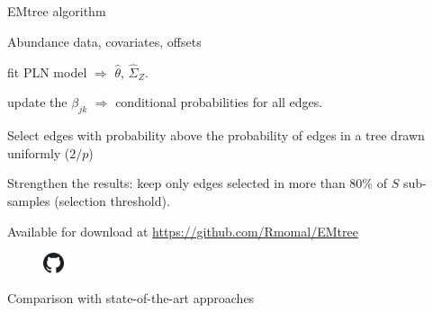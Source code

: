 \documentclass[11pt]{beamer}
\newcommand{\emphase}[1]{\textcolor{Complement}{#1}}
\newcommand{\bleu}[1]{\textcolor{Framableulight}{#1}}
\begin{document}
\subsection{}
\begin{frame}{EMtree algorithm}
\begin{description}
\normalsize
\item [Input: ] \hspace{0.35cm}Abundance data, covariates, offsets\vspace{0.2cm}

\item [1rst step: ] \hspace{0.3cm} \emphase{fit PLN model} $\Rightarrow$  $\hat{\theta}$, $\hat{\Sigma}_Z$. \vspace{0.2cm}
\item [2nd step: ] \hspace{0.3cm} \emphase{update the $\beta_{jk}$} $\Rightarrow$ conditional probabilities for all edges.\\ \hspace{0.3cm} 
\bigskip
\item [Thresholding: ] Select edges with probability above the probability of edges in a tree drawn uniformly (\emphase{$2/p$})\vspace{0.2cm}
\item [Resampling: ] \hspace{0.25cm}Strengthen the results: keep only edges selected in more than \emphase{$80\%$} of $S$ sub-samples (selection threshold).
\end{description} \bigskip

Available for download at \url{https://github.com/Rmomal/EMtree}
\begin{figure}
    \centering
    \includegraphics[width=0.6cm]{github.png}
\end{figure}
\end{frame}


\begin{frame}
\begin{center}
\huge{\bleu{Comparison with state-of-the-art approaches}}
\end{center}
\end{frame}
\end{document}
